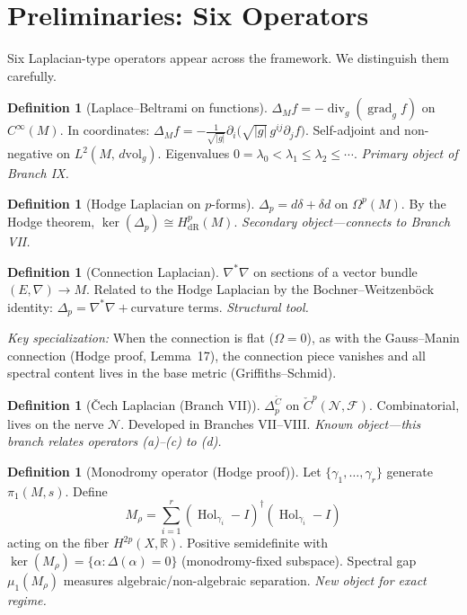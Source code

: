 \documentclass[11pt]{article}
\theoremstyle{definition}
\newtheorem{definition}[theorem]{Definition}
\theoremstyle{remark}
\newcommand{\Hol}{\operatorname{Hol}}
\newcommand{\dvol}{\,d\mathrm{vol}}
\begin{document}
\section{Preliminaries: Six Operators}
\label{sec:prelim}

Six Laplacian-type operators appear across the framework. We distinguish them carefully.

\begin{definition}[Laplace--Beltrami on functions]\label{def:LB}
$\Delta_M f = -\operatorname{div}_g(\operatorname{grad}_g f)$ on $C^\infty(M)$. In coordinates: $\Delta_M f = -\frac{1}{\sqrt{|g|}}\partial_i\bigl(\sqrt{|g|}\,g^{ij}\partial_j f\bigr)$. Self-adjoint and non-negative on $L^2(M, \dvol_g)$. Eigenvalues $0 = \lambda_0 < \lambda_1 \le \lambda_2 \le \cdots$. \emph{Primary object of Branch IX.}
\end{definition}

\begin{definition}[Hodge Laplacian on $p$-forms]\label{def:Hodge}
$\Delta_p = d\delta + \delta d$ on $\Omega^p(M)$. By the Hodge theorem, $\ker(\Delta_p) \cong H^p_{\mathrm{dR}}(M)$. \emph{Secondary object---connects to Branch VII.}
\end{definition}

\begin{definition}[Connection Laplacian]\label{def:conn}
$\nabla^*\nabla$ on sections of a vector bundle $(E, \nabla) \to M$. Related to the Hodge Laplacian by the Bochner--Weitzenb\"{o}ck identity: $\Delta_p = \nabla^*\nabla + \text{curvature terms}$. \emph{Structural tool.}

\emph{Key specialization:} When the connection is flat ($\Omega = 0$), as with the Gauss--Manin connection (Hodge proof, Lemma~17), the connection piece vanishes and all spectral content lives in the base metric (Griffiths--Schmid).
\end{definition}

\begin{definition}[\v{C}ech Laplacian (Branch VII)]\label{def:Cech}
$\Delta_p^{\check{C}}$ on $\check{C}^p(\mathcal{N}, \mathcal{F})$. Combinatorial, lives on the nerve $\mathcal{N}$. Developed in Branches VII--VIII. \emph{Known object---this branch relates operators (a)--(c) to (d).}
\end{definition}

\begin{definition}[Monodromy operator (Hodge proof)]\label{def:mono}
Let $\{\gamma_1, \ldots, \gamma_r\}$ generate $\pi_1(M, s)$. Define
\[
M_\rho = \sum_{i=1}^r (\Hol_{\gamma_i} - I)^\dagger (\Hol_{\gamma_i} - I)
\]
acting on the fiber $H^{2p}(X, \mathbb{R})$. Positive semidefinite with $\ker(M_\rho) = \{\alpha : \Delta(\alpha) = 0\}$ (monodromy-fixed subspace). Spectral gap $\mu_1(M_\rho)$ measures algebraic/non-algebraic separation. \emph{New object for exact regime.}
\end{definition}
\end{document}
